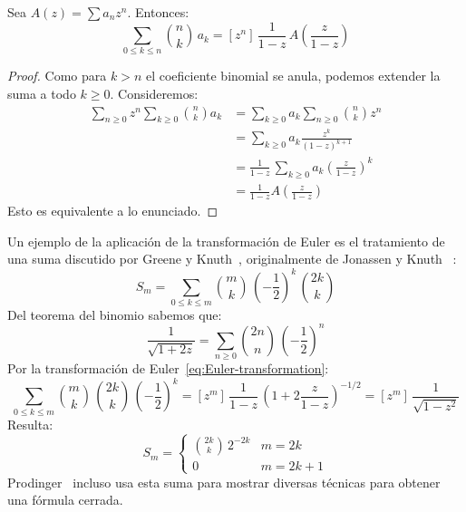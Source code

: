   \begin{theorem}
    \label{theo:Euler-transformation}
    Sea \(A(z) = \sum a_n z^n\).
    Entonces:
    \begin{equation}
      \label{eq:Euler-transformation}
       \sum_{0 \le k \le n} \binom{n}{k} \, a_k
	 = \left[ z^n \right] \,
	     \frac{1}{1 - z} \,
	       A \left(
		   \frac{z}{1 - z}
		 \right)
    \end{equation}
  \end{theorem}
  \begin{proof}
    Como para \(k > n\) el coeficiente binomial se anula,
    podemos extender la suma a todo \(k \ge 0\).
    Consideremos:
    \begin{align*}
      \sum_{n \ge 0} z^n \sum_{k \ge 0} \binom{n}{k} a_k
	&= \sum_{k \ge 0} a_k \sum_{n \ge 0} \binom{n}{k} z^n \\
	&= \sum_{k \ge 0} a_k \frac{z^k}{(1 - z)^{k + 1}} \\
	&= \frac{1}{1 - z} \,
	    \sum_{k \ge 0} a_k \left( \frac{z}{1 - z} \right)^k \\
	&= \frac{1}{1 - z} A \left(  \frac{z}{1 - z} \right)
    \end{align*}
    Esto es equivalente a lo enunciado.
  \end{proof}
  Un ejemplo de la aplicación de la transformación de Euler
  es el tratamiento de una suma
  discutido por Greene y Knuth~\cite{greene10:_math_anal_algor},
  originalmente de Jonassen y Knuth~%
    \cite{jonassen78:_trivial_algorithm}:
  \begin{equation*}
    S_m
      = \sum_{0 \le k \le m}
	  \binom{m}{k} \, \left( - \frac{1}{2} \right)^k \, \binom{2 k}{k}
  \end{equation*}
  Del teorema del binomio sabemos que:
  \begin{equation*}
    \frac{1}{\sqrt{1 + 2 z}}
      = \sum_{n \ge 0}
	  \binom{2 n}{n} \, \left( - \frac{1}{2} \right)^n
  \end{equation*}
  Por la transformación de Euler~\eqref{eq:Euler-transformation}:
  \begin{equation*}
    \sum_{0 \le k \le m}
      \binom{m}{k} \, \binom{2 k}{k}
	\, \left( - \frac{1}{2} \right)^k
      = \left[ z^m \right] \,
	  \frac{1}{1 - z} \,
	    \left( 1 + 2 \frac{z}{1 - z} \right)^{-1/2}
      = \left[ z^m \right] \,
	  \frac{1}{\sqrt{1 - z^2}}
  \end{equation*}
  Resulta:
  \begin{equation*}
    S_m
      = \begin{cases}
	  \displaystyle \binom{2 k}{k} \, 2^{-2 k} & m = 2 k \\
	  0					   & m = 2 k + 1
	\end{cases}
  \end{equation*}
  Prodinger~\cite{prodinger94:_old_sum}
  incluso usa esta suma para mostrar diversas técnicas
  para obtener una fórmula cerrada.

